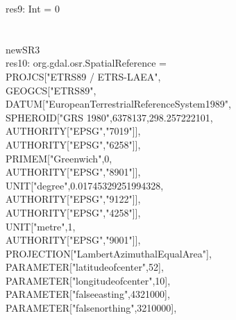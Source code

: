 \documentclass {article}
\begin{document}
res9: Int = 0\\
\\
\\
newSR3\\
res10: org.gdal.osr.SpatialReference =\\
PROJCS["ETRS89 / ETRS-LAEA",\\
\hspace*{2mm} GEOGCS["ETRS89",\\
\hspace*{4mm} DATUM["European\underline{\space}Terrestrial\underline{\space}Reference\underline{\space}System\underline{\space}1989",\\
\hspace*{6mm} SPHEROID["GRS 1980",6378137,298.257222101,\\
\hspace*{8mm} AUTHORITY["EPSG","7019"]],\\
\hspace*{6mm} AUTHORITY["EPSG","6258"]],\\
\hspace*{4mm} PRIMEM["Greenwich",0,\\
\hspace*{6mm} AUTHORITY["EPSG","8901"]],\\
\hspace*{4mm} UNIT["degree",0.01745329251994328,\\
\hspace*{6mm} AUTHORITY["EPSG","9122"]],\\
\hspace*{4mm} AUTHORITY["EPSG","4258"]],\\
\hspace*{2mm} UNIT["metre",1,\\
\hspace*{4mm} AUTHORITY["EPSG","9001"]],\\
\hspace*{2mm} PROJECTION["Lambert\underline{\space}Azimuthal\underline{\space}Equal\underline{\space}Area"],\\
\hspace*{2mm} PARAMETER["latitude\underline{\space}of\underline{\space}center",52],\\
\hspace*{2mm} PARAMETER["longitude\underline{\space}of\underline{\space}center",10],\\
\hspace*{2mm} PARAMETER["false\underline{\space}easting",4321000],\\
\hspace*{2mm} PARAMETER["false\underline{\space}northing",3210000],\\
\end{document}
